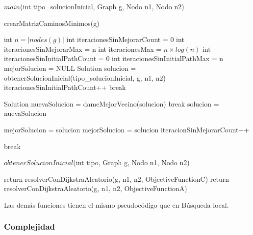 \begin{algorithm}[H]
\caption{$main$(int tipo\_solucionInicial, Graph g, Nodo n1, Nodo n2)}
\begin{algorithmic}[1]
  \State crearMatrizCaminosMinimos(g)
  
  \State int $n = |nodes(g)|$
  \State int iteracionesSinMejorarCount = 0
  \State int iteracionesSinMejorarMax = n
  \State int iteracionesMax = $n \times log(n)$
  \State int iteracionesSinInitialPathCount = 0
  \State int iteracionesSinInitialPathMax = n
  \State mejorSolucion = NULL
  	\State Solution solucion = obtenerSolucionInicial(tipo\_solucionInicial, g, n1, n2)	
    		\State iteracionesSinInitialPathCount++
			break
		\EndIf
        \EndIf

  
	    	\State Solution nuevaSolucion = dameMejorVecino(solucion)
			\State break	
		\EndIf    
		\State solucion = nuevaSolucion	
	    \EndWhile
	  
	  	\State mejorSolucion = solucion
	  	\State mejorSolucion = solucion
	  \Else
	  	\State iteracionSinMejorarCount++
	  \EndIf
	\EndIf
	
                \State break
        \EndIf
	  
    \EndFor
\end{algorithmic}
\end{algorithm}

\begin{algorithm}[H]
\caption{$obtenerSolucionInicial$(int tipo, Graph g, Nodo n1, Nodo n2)}
\begin{algorithmic}[1]
	\State return resolverConDijkstraAleatorio(g, n1, n2, ObjectiveFunctionC)
  \EndIf
  \State return resolverConDijkstraAleatorio(g, n1, n2, ObjectiveFunctionA)
\end{algorithmic}
\end{algorithm}

Las demás funciones tienen el mismo pseudocódigo que en Búsqueda local.

\subsubsection{Complejidad}

